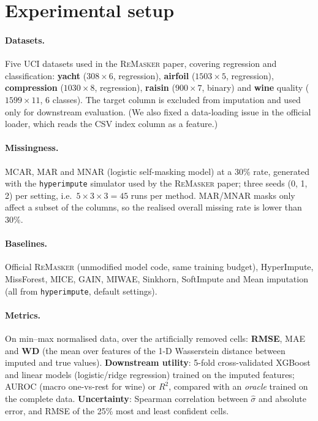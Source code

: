 \documentclass[11pt]{article}
\newcommand{\remasker}{\textsc{ReMasker}}
\begin{document}
\section{Experimental setup}
\paragraph{Datasets.} Five UCI datasets used in the \remasker{} paper, covering regression and classification: \textbf{yacht} ($308\times6$, regression), \textbf{airfoil} ($1503\times5$, regression), \textbf{compression} ($1030\times8$, regression), \textbf{raisin} ($900\times7$, binary) and \textbf{wine} quality ($1599\times11$, 6 classes). The target column is excluded from imputation and used only for downstream evaluation. (We also fixed a data-loading issue in the official loader, which reads the CSV index column as a feature.)

\paragraph{Missingness.} MCAR, MAR and MNAR (logistic self-masking model) at a 30\% rate, generated with the \texttt{hyperimpute} simulator used by the \remasker{} paper; three seeds (0, 1, 2) per setting, i.e.\ $5\times3\times3=45$ runs per method. MAR/MNAR masks only affect a subset of the columns, so the realised overall missing rate is lower than 30\%.

\paragraph{Baselines.} Official \remasker{} (unmodified model code, same training budget), HyperImpute, MissForest, MICE, GAIN, MIWAE, Sinkhorn, SoftImpute and Mean imputation (all from \texttt{hyperimpute}, default settings).

\paragraph{Metrics.} On min--max normalised data, over the artificially removed cells: \textbf{RMSE}, MAE and \textbf{WD} (the mean over features of the 1-D Wasserstein distance between imputed and true values). \textbf{Downstream utility}: 5-fold cross-validated XGBoost and linear models (logistic/ridge regression) trained on the imputed features; AUROC (macro one-vs-rest for wine) or $R^2$, compared with an \emph{oracle} trained on the complete data. \textbf{Uncertainty}: Spearman correlation between $\hat\sigma$ and absolute error, and RMSE of the 25\% most and least confident cells.
\end{document}
